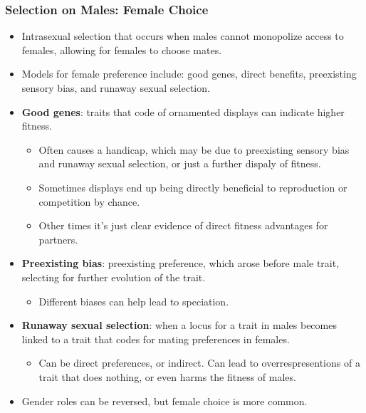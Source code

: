 \documentclass[12pt,a4paper]{article}
\begin{document}
\begin{itemize}
    \subsubsection{Selection on Males: Female Choice}
    \begin{itemize}
        \item Intrasexual selection that occurs when males cannot monopolize access to females, allowing for females to choose mates.
        \item Models for female preference include: good genes, direct benefits, preexisting sensory bias, and runaway sexual selection.
        \item \textbf{Good genes}: traits that code of ornamented displays can indicate higher fitness.
            \begin{itemize}
                \item Often causes a handicap, which may be due to preexisting sensory bias and runaway sexual selection, or just a further dispaly of fitness.
                \item Sometimes displays end up being directly beneficial to reproduction or competition by chance.
                \item Other times it's just clear evidence of direct fitness advantages for partners.
            \end{itemize}
        \item \textbf{Preexisting bias}: preexisting preference, which arose before male trait, selecting for further evolution of the trait.
            \begin{itemize}
                \item Different biases can help lead to speciation.
            \end{itemize}
        \item \textbf{Runaway sexual selection}: when a locus for a trait in males becomes linked to a trait that codes for mating preferences in females.
            \begin{itemize}
                \item Can be direct preferences, or indirect. Can lead to overrespresentions of a trait that does nothing, or even harms the fitness of males.
            \end{itemize}
        \item Gender roles can be reversed, but female choice is more common.
    \end{itemize}

\end{itemize}
\end{document}
